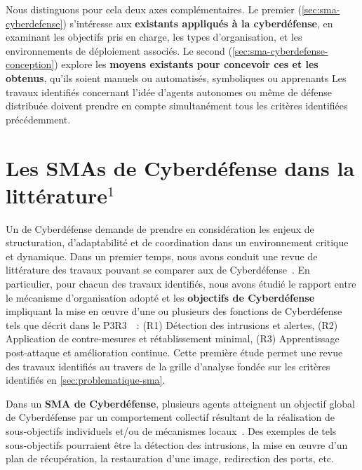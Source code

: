Nous distinguons pour cela deux axes complémentaires. Le premier (\autoref{sec:sma-cyberdefense}) s'intéresse aux \textbf{ existants appliqués à la cyberdéfense}, en examinant les objectifs pris en charge, les types d'organisation, et les environnements de déploiement associés. Le second (\autoref{sec:sma-cyberdefense-conception}) explore les \textbf{moyens existants pour concevoir ces  et les  obtenus}, qu'ils soient manuels ou automatisés, symboliques ou apprenants
%
Les travaux identifiés concernant l'idée d'agents autonomes ou même de défense distribuée doivent prendre en compte simultanément tous les critères identifiées précédemment.


\section{Les SMAs de Cyberdéfense dans la littérature$^{1}$}\label{sec:sma-cyberdefense}


Un  de Cyberdéfense demande de prendre en considération les enjeux de structuration, d'adaptabilité et de coordination dans un environnement critique et dynamique.
Dans un premier temps, nous avons conduit une revue de littérature des travaux pouvant se comparer aux  de Cyberdéfense~\cite{soule2023ressithese}.
En particulier, pour chacun des travaux identifiés, nous avons étudié le rapport entre le mécanisme d'organisation adopté et les \textbf{objectifs de Cyberdéfense} impliquant la mise en œuvre d'une ou plusieurs des fonctions de Cyberdéfense tels que décrit dans le P3R3~\cite{Theron2013P3R3}~:
(R1) Détection des intrusions et alertes,
(R2) Application de contre-mesures et rétablissement minimal,
(R3) Apprentissage post-attaque et amélioration continue.
Cette première étude permet une revue des travaux identifiés au travers de la grille d'analyse fondée sur les critères identifiés en \autoref{sec:problematique-sma}.

Dans un \textbf{SMA de Cyberdéfense}, plusieurs agents atteignent un objectif global de Cyberdéfense par un comportement collectif résultant de la réalisation de sous-objectifs individuels et/ou de mécanismes locaux~\cite{jamont2015meeting}.
Des exemples de tels sous-objectifs pourraient être la détection des intrusions, la mise en œuvre d'un plan de récupération, la restauration d'une image, redirection des ports, etc.

